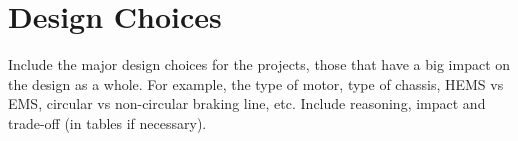 \chapter{Design Choices} \label{chap:design-choices}

Include the major design choices for the projects, those that have a big impact on the design as a whole. For example, the type of motor, type of chassis, HEMS vs EMS, circular vs non-circular braking line, etc. Include reasoning, impact and trade-off (in tables if necessary). 